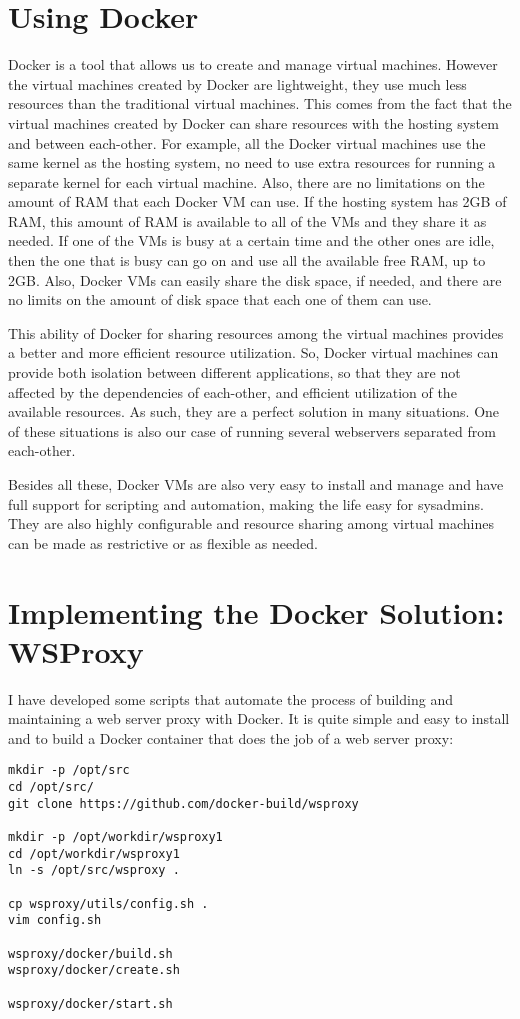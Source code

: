 \documentclass[a4paper]{article}
\begin{document}
\section{Using Docker}

Docker is a tool that allows us to create and manage virtual machines.
However the virtual machines created by Docker are lightweight, they
use much less resources than the traditional virtual machines. This
comes from the fact that the virtual machines created by Docker can
share resources with the hosting system and between each-other. For
example, all the Docker virtual machines use the same kernel as the
hosting system, no need to use extra resources for running a separate
kernel for each virtual machine. Also, there are no limitations on the
amount of RAM that each Docker VM can use. If the hosting system has
2GB of RAM, this amount of RAM is available to all of the VMs and they
share it as needed. If one of the VMs is busy at a certain time and
the other ones are idle, then the one that is busy can go on and use
all the available free RAM, up to 2GB. Also, Docker VMs can easily
share the disk space, if needed, and there are no limits on the amount
of disk space that each one of them can use.

This ability of Docker for sharing resources among the virtual
machines provides a better and more efficient resource utilization.
So, Docker virtual machines can provide both isolation between
different applications, so that they are not affected by the
dependencies of each-other, and efficient utilization of the available
resources. As such, they are a perfect solution in many situations.
One of these situations is also our case of running several webservers
separated from each-other.

Besides all these, Docker VMs are also very easy to install and manage
and have full support for scripting and automation, making the life
easy for sysadmins. They are also highly configurable and resource
sharing among virtual machines can be made as restrictive or as
flexible as needed.


\section{Implementing the Docker Solution: WSProxy}

I have developed some scripts that automate the process of building
and maintaining a web server proxy with Docker. It is quite simple and
easy to install and to build a Docker container that does the job of a
web server proxy:
\begin{verbatim}
mkdir -p /opt/src
cd /opt/src/
git clone https://github.com/docker-build/wsproxy

mkdir -p /opt/workdir/wsproxy1
cd /opt/workdir/wsproxy1
ln -s /opt/src/wsproxy .

cp wsproxy/utils/config.sh .
vim config.sh

wsproxy/docker/build.sh
wsproxy/docker/create.sh

wsproxy/docker/start.sh
\end{verbatim}
\end{document}
